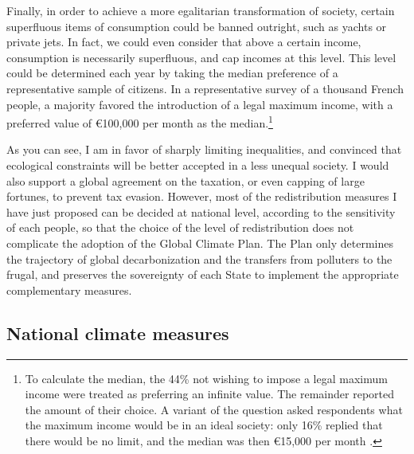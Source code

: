 \documentclass[a5paper,english,openany]{memoir}
\begin{document}
Finally, in order to achieve a more %
egalitarian transformation of society, certain superfluous items of consumption could be banned outright, such as yachts or private jets. In fact, we could even consider that above a certain income, consumption is necessarily superfluous, and cap incomes at this level. This level could be determined each year by taking the median preference of a representative sample of citizens. In a representative survey of a thousand French people, a majority favored %
the introduction of a legal maximum income, with a preferred value of \euro{}100,000 per month as the median.\footnote{To calculate the median, the 44\% not wishing to impose a legal maximum income were treated as preferring an infinite value. The remainder reported the amount of their choice. A variant of the question asked respondents what the maximum income would be in an ideal society: only 16\% replied that there would be no limit, and the median was then \euro{}15,000 per month \citep{fabre_determiner_2022}.} 

As you can see, I am in favor %
of sharply limiting inequalities, and convinced that ecological constraints will be better accepted in a less unequal society. I would also support %
a global agreement on the taxation, or even capping %
of large fortunes, to prevent tax evasion. However, most of the redistribution measures I have just proposed can be decided at national level, according to the sensitivity of each people, so that the choice of the level of redistribution does not complicate the adoption of the Global Climate Plan. The Plan only determines the  trajectory of global decarbonization  %
and the transfers from polluters to the frugal, and preserves the sovereignty of each State to implement the appropriate complementary measures.

\subsection{National climate measures} %
\end{document}
